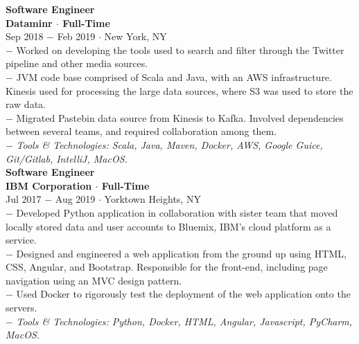 \documentclass{resume}
\begin{document}
\begin{flushleft}
\normalsize{\bf Software Engineer}\\
\footnotesize{\bf Dataminr $\cdot$ Full-Time}\\
\footnotesize{Sep 2018  $-$ Feb 2019 $\cdot$ New York, NY}\\[1mm]
{\scriptsize
$-$ Worked on developing the tools used to search and filter through the Twitter pipeline and other media sources. \\
$-$ JVM code base comprised of Scala and Java, with an AWS infrastructure. Kinesis used for processing the large data sources, where S3 was used to store the raw data.\\
$-$ Migrated Pastebin data source from Kinesis to Kafka. Involved dependencies between several teams, and required collaboration among them. \\
$-$ \textit{Tools \& Technologies: Scala, Java, Maven, Docker, AWS, Google Guice, Git/Gitlab, IntelliJ, MacOS.}\\[3mm]
}
\normalsize{\bf Software Engineer}\\
\footnotesize{\bf IBM Corporation $\cdot$ Full-Time}\\
\footnotesize{Jul 2017  $-$ Aug 2019 $\cdot$ Yorktown Heights, NY}\\[1mm]
{\scriptsize
	$-$ Developed Python application in collaboration with sister team that moved locally stored data and user accounts to Bluemix, IBM's cloud platform as a service. \\
	$-$ Designed and engineered a web application from the ground up using HTML, CSS, Angular, and Bootstrap. Responsible for the front-end, including page navigation using an MVC design pattern. \\
	$-$ Used Docker to rigorously test the deployment of the web application onto the servers. \\
	$-$ \textit{Tools \& Technologies: Python, Docker, HTML, Angular, Javascript, PyCharm, MacOS.}\\[4mm]
}



\end{flushleft}
\end{document}
